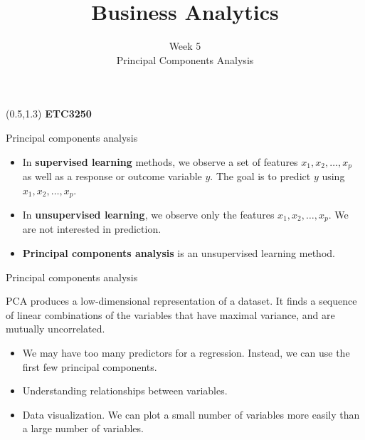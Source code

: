 \documentclass[14pt]{beamer}
\title[5. Principal Components Analysis]{Business Analytics}
\author{Week 5\\ Principal Components Analysis}
\begin{document}
\begin{frame}[plain]{}
\maketitle
\begin{textblock}{11}(0.5,1.3){\color{white}\large
\textbf{ETC3250}}
\end{textblock}
\end{frame}



\begin{frame}{Principal components analysis}
\begin{itemize}
\item In \textbf{supervised learning} methods, we observe a set of features
$x_1, x_2, \dots, x_p$ as well as a response or outcome variable $y$. The goal is to predict $y$ using $x_1, x_2, \dots, x_p$.
\item In \textbf{unsupervised learning}, we observe only the features $x_1, x_2, \dots, x_p$. We are not interested in prediction.

\item \textbf{Principal components analysis} is an unsupervised learning method.
\end{itemize}

\end{frame}

\begin{frame}{Principal components analysis}

\begin{block}{}
PCA produces a low-dimensional representation of a
dataset. It finds a sequence of linear combinations of the
variables that have maximal variance, and are mutually
uncorrelated.
\end{block}\pause


\begin{itemize}
\item We may have too many predictors for a regression. Instead, we can use the first few principal components. 

\item Understanding relationships between variables.

\item Data visualization. We can plot a small number of variables more easily than a large number of variables.
\end{itemize}
\end{frame}
\end{document}
